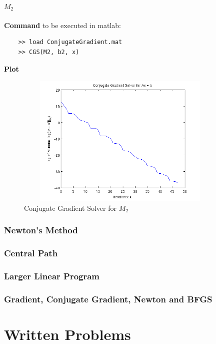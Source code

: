 \documentclass[11pt,a4paper]{article}
\begin{document}
\subsection{$M_2$}
{\bf Command} to be executed in matlab:
\begin{verbatim}
    >> load ConjugateGradient.mat
    >> CGS(M2, b2, x)
\end{verbatim}
{\bf Plot}
\begin{figure}[h]
    \centering
    \includegraphics[width=4in,height=2.5in]{../ps4_matlab/M2.png}
    \caption{Conjugate Gradient Solver for $M_2$}
\end{figure}

\newpage
\section{Newton’s Method}

\newpage
\section{Central Path}


\newpage
\section{Larger Linear Program}

\newpage
\section{Gradient, Conjugate Gradient, Newton and BFGS}

\newpage
\part{Written Problems}
\end{document}
